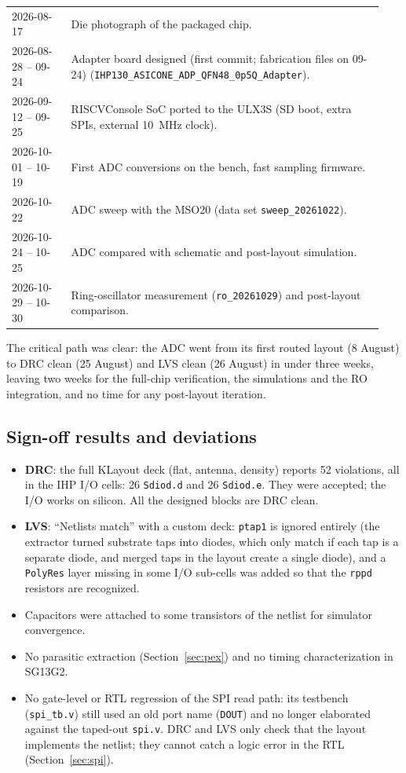 \documentclass[10pt,a4paper]{article}
\begin{document}
\begin{longtable}{p{0.15\linewidth}p{0.79\linewidth}}
2026-08-17 & Die photograph of the packaged chip. \\
2026-08-28 -- 09-24 & Adapter board designed (first commit; fabrication files on 09-24) (\texttt{IHP130\_ASICONE\_ADP\_QFN48\_0p5Q\_Adapter}). \\
2026-09-12 -- 09-25 & RISCVConsole SoC ported to the ULX3S (SD boot, extra SPIs, external \SI{10}{MHz} clock). \\
2026-10-01 -- 10-19 & First ADC conversions on the bench, fast sampling firmware. \\
2026-10-22 & ADC sweep with the MSO20 (data set \texttt{sweep\_20261022}). \\
2026-10-24 -- 10-25 & ADC compared with schematic and post-layout simulation. \\
2026-10-29 -- 10-30 & Ring-oscillator measurement (\texttt{ro\_20261029}) and post-layout comparison. \\
\bottomrule
\end{longtable}
The critical path was clear: the ADC went from its first routed layout (8 August) to DRC clean
(25 August) and LVS clean (26 August) in under three weeks, leaving two weeks for the full-chip
verification, the simulations and the RO integration, and no time for any post-layout iteration.

\subsection{Sign-off results and deviations}
\begin{itemize}
  \item \textbf{DRC}: the full KLayout deck (flat, antenna, density) reports 52 violations, all in the
        IHP I/O cells: 26 \texttt{Sdiod.d} and 26 \texttt{Sdiod.e}. They were accepted; the I/O
        works on silicon. All the designed blocks are DRC clean.
  \item \textbf{LVS}: ``Netlists match'' with a custom deck: \texttt{ptap1} is ignored entirely (the
        extractor turned substrate taps into diodes, which only match if each tap is a separate diode,
        and merged taps in the layout create a single diode), and a \texttt{PolyRes} layer missing in some
        I/O sub-cells was added so that the \texttt{rppd} resistors are recognized.
  \item Capacitors were attached to some transistors of the netlist for simulator convergence.
  \item No parasitic extraction (Section~\ref{sec:pex}) and no timing characterization in SG13G2.
  \item No gate-level or RTL regression of the SPI read path: its testbench (\texttt{spi\_tb.v}) still
        used an old port name (\texttt{DOUT}) and no longer elaborated against the taped-out
        \texttt{spi.v}. DRC and LVS only check that the layout implements the netlist; they cannot
        catch a logic error in the RTL (Section~\ref{sec:spi}).
\end{itemize}
\end{document}

